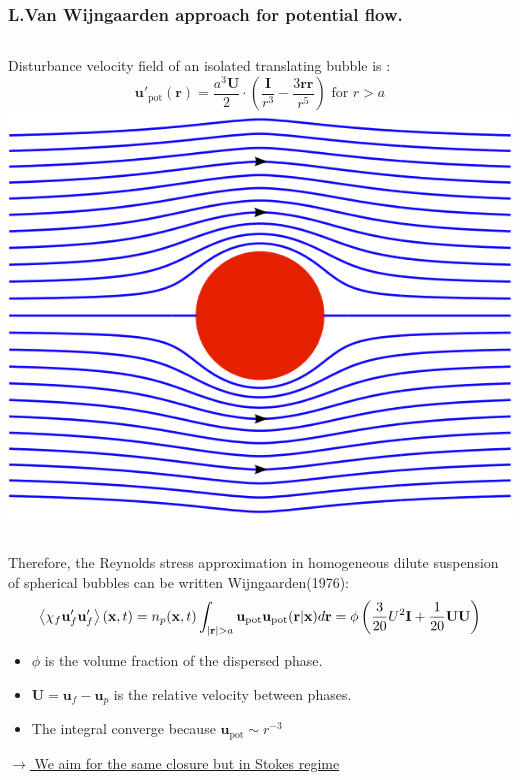 \documentclass{sintefbeamer}
\begin{document}
\begin{frame}
  \frametitle{L.Van Wijngaarden approach for potential flow.}

  \begin{columns}
Disturbance velocity field of an isolated translating bubble is :
\begin{equation*}
  \textbf{u}'_\text{pot}(\textbf{r})
  = \frac{a^3 \textbf{U}}{2} \cdot \left(\frac{\textbf{I}}{r^3} - \frac{3 \textbf{rr}}{r^5}\right)
  \text{    for    }r>a
\end{equation*}
\includegraphics[width=\textwidth,angle=90]{image/Potential_cylinder.png}
\end{columns}
\pause
Therefore, the Reynolds stress approximation in homogeneous dilute suspension of spherical bubbles can be written Wijngaarden(1976): 
  \begin{align*}
    \left<\chi_f \textbf{u}'_f\textbf{u}'_f\right>(\textbf{x},t)
    =
    n_p(\textbf{x},t)
      \int_{|\textbf{r}| > a }
       \textbf{u}_\text{pot}\textbf{u}_\text{pot}(\textbf{r}|\textbf{x}) d\textbf{r}
    = \phi \left(\frac{3}{20} U^2\textbf{I} + \frac{1}{20}\textbf{UU} \right)
\end{align*}

  \begin{itemize}
    \item $\phi$ is the volume fraction of the dispersed phase. 
    \item $\textbf{U} = \textbf{u}_f-\textbf{u}_p$ is the relative velocity between phases. 
    \item The integral converge because $\textbf{u}_\text{pot}  \sim r^{-3}$
  \end{itemize}
  \underline{$\to$ We aim for the same closure but in Stokes regime}
\end{frame}
\end{document}
